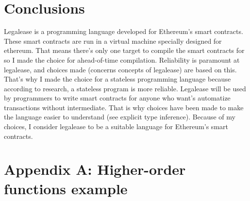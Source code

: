 \documentclass{uva-inf-article}
\begin{document}
\section{Conclusions}
\par Legalease is a programming language developed for Ethereum's smart contracts. 
These smart contracts are run in a virtual machine specially designed for ethereum.
That means there's only one target to compile the smart contracts for so I made the choice for ahead-of-time compilation.
Reliability is paramount at legalease, and choices made (concerns concepts of legalease) are based on this.
That's why I made the choice for a stateless programming language because according to research, a stateless program is more reliable.
Legalease will be used by programmers to write smart contracts for anyone who want's automatize transactions without intermediate.
That is why choices have been made to make the language easier to understand (see explicit type inference).
Because of my choices, I consider legalease to be a suitable language for Ethereum's smart contracts.


\newpage

\printbibliography

\newpage

\newpage
\section{Appendix A: Higher-order functions example}

\end{document}
